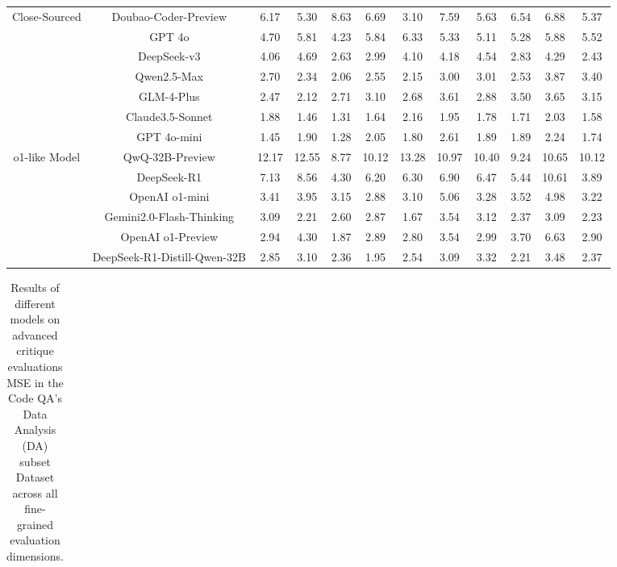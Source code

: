 \documentclass[11pt, a4paper, logo, copyright, nonumbering, amsart]{map}
\begin{document}
\begin{CJK*}{UTF8}{gbsn}
\begin{table*}[h!]
\begin{adjustbox}{width=\textwidth}
\begin{tabular}{c|c|cccccccccc}
    \midrule
    \multirow{7}{*}{Close-Sourced} 
    & Doubao-Coder-Preview & 6.17 & 5.30 & 8.63 & 6.69 & 3.10 & 7.59 & 5.63 & 6.54 & 6.88 & 5.37 \\
    & GPT 4o & 4.70 & 5.81 & 4.23 & 5.84 & 6.33 & 5.33 & 5.11 & 5.28 & 5.88 & 5.52 \\
    & DeepSeek-v3 & 4.06 & 4.69 & 2.63 & 2.99 & 4.10 & 4.18 & 4.54 & 2.83 & 4.29 & 2.43 \\
    & Qwen2.5-Max & 2.70 & 2.34 & 2.06 & 2.55 & 2.15 & 3.00 & 3.01 & 2.53 & 3.87 & 3.40 \\
    & GLM-4-Plus & 2.47 & 2.12 & 2.71 & 3.10 & 2.68 & 3.61 & 2.88 & 3.50 & 3.65 & 3.15 \\
    & Claude3.5-Sonnet & 1.88 & 1.46 & 1.31 & 1.64 & 2.16 & 1.95 & 1.78 & 1.71 & 2.03 & 1.58 \\
    & GPT 4o-mini & 1.45 & 1.90 & 1.28 & 2.05 & 1.80 & 2.61 & 1.89 & 1.89 & 2.24 & 1.74 \\
    
    \midrule
    \multirow{6}{*}{o1-like Model} 
    & QwQ-32B-Preview & 12.17 & 12.55 & 8.77 & 10.12 & 13.28 & 10.97 & 10.40 & 9.24 & 10.65 & 10.12 \\
    & DeepSeek-R1 & 7.13 & 8.56 & 4.30 & 6.20 & 6.30 & 6.90 & 6.47 & 5.44 & 10.61 & 3.89 \\
    & OpenAI o1-mini & 3.41 & 3.95 & 3.15 & 2.88 & 3.10 & 5.06 & 3.28 & 3.52 & 4.98 & 3.22 \\
    & Gemini2.0-Flash-Thinking & 3.09 & 2.21 & 2.60 & 2.87 & 1.67 & 3.54 & 3.12 & 2.37 & 3.09 & 2.23 \\
    & OpenAI o1-Preview & 2.94 & 4.30 & 1.87 & 2.89 & 2.80 & 3.54 & 2.99 & 3.70 & 6.63 & 2.90 \\
    & DeepSeek-R1-Distill-Qwen-32B & 2.85 & 3.10 & 2.36 & 1.95 & 2.54 & 3.09 & 3.32 & 2.21 & 3.48 & 2.37 \\
    \bottomrule
    \end{tabular}
    \end{adjustbox}
\end{table*}

\begin{table*}[h!]
    \centering
    \caption{Results of different models on advanced critique evaluations MSE in the Code QA's Data Analysis (DA) subset Dataset across all fine-grained evaluation dimensions.} \label{table:real_level2_da_dim}
    \begin{adjustbox}{width=\textwidth}
    \begin{tabular}{c|c|cccccccccc}
    

\end{tabular}
\end{adjustbox}
\end{table*}
\end{CJK*}
\end{document}

